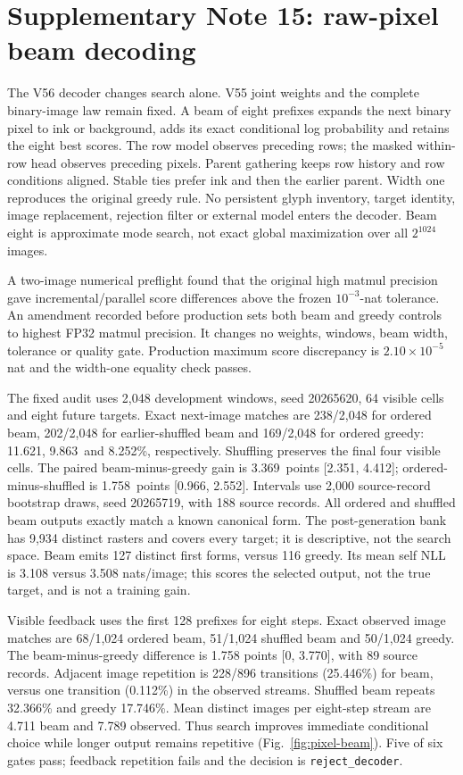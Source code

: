 \documentclass[10pt,a4paper]{article}
\newcommand{\BeamAccuracy}{11.621}
\newcommand{\BeamShuffled}{9.863}
\newcommand{\GreedyAccuracy}{8.252}
\newcommand{\BeamGain}{3.369}
\newcommand{\BeamGainLow}{2.351}
\newcommand{\BeamGainHigh}{4.412}
\newcommand{\BeamHistoryGain}{1.758}
\newcommand{\BeamHistoryLow}{0.966}
\newcommand{\BeamHistoryHigh}{2.552}
\newcommand{\BeamRepeat}{25.446}
\newcommand{\TargetRepeat}{0.112}
\newcommand{\BeamDecision}{reject\_decoder}
\begin{document}
\section*{Supplementary Note 15: raw-pixel beam decoding}
The V56 decoder changes search alone. V55 joint weights and the complete
binary-image law remain fixed. A beam of eight prefixes expands the next
binary pixel to ink or background, adds its exact conditional log probability
and retains the eight best scores. The row model observes preceding rows;
the masked within-row head observes preceding pixels. Parent gathering keeps
row history and row conditions aligned. Stable ties prefer ink and then the
earlier parent. Width one reproduces the original greedy rule. No persistent
glyph inventory, target identity, image replacement, rejection filter or
external model enters the decoder. Beam eight is approximate mode search,
not exact global maximization over all $2^{1024}$ images.

A two-image numerical preflight found that the original high matmul precision
gave incremental/parallel score differences above the frozen $10^{-3}$-nat
tolerance. An amendment recorded before production sets both beam and greedy
controls to highest FP32 matmul precision. It changes no weights, windows,
beam width, tolerance or quality gate. Production maximum score discrepancy
is $2.10\times10^{-5}$ nat and the width-one equality check passes.

The fixed audit uses 2,048 development windows, seed 20265620, 64 visible cells
and eight future targets. Exact next-image matches are 238/2,048 for ordered
beam, 202/2,048 for earlier-shuffled beam and 169/2,048 for ordered greedy:
\BeamAccuracy, \BeamShuffled\ and \GreedyAccuracy\%, respectively. Shuffling
preserves the final four visible cells. The paired beam-minus-greedy gain is
\BeamGain\ points [\BeamGainLow, \BeamGainHigh]; ordered-minus-shuffled is
\BeamHistoryGain\ points [\BeamHistoryLow, \BeamHistoryHigh]. Intervals use
2,000 source-record bootstrap draws, seed 20265719, with 188 source records.
All ordered and shuffled beam outputs exactly match a known canonical form.
The post-generation bank has 9,934 distinct rasters and covers every target;
it is descriptive, not the search space. Beam emits 127 distinct first forms,
versus 116 greedy. Its mean self NLL is 3.108 versus 3.508 nats/image; this
scores the selected output, not the true target, and is not a training gain.

Visible feedback uses the first 128 prefixes for eight steps. Exact observed
image matches are 68/1,024 ordered beam, 51/1,024 shuffled beam and 50/1,024
greedy. The beam-minus-greedy difference is 1.758 points [0, 3.770], with 89
source records. Adjacent image repetition is 228/896 transitions
(\BeamRepeat\%) for beam, versus one transition (\TargetRepeat\%) in the
observed streams. Shuffled beam repeats 32.366\% and greedy 17.746\%.
Mean distinct images per eight-step stream are 4.711 beam and 7.789 observed.
Thus search improves immediate conditional choice while longer output remains
repetitive (Fig.~\ref{fig:pixel-beam}). Five of six gates pass; feedback
repetition fails and the decision is \texttt{\BeamDecision}.
\end{document}
